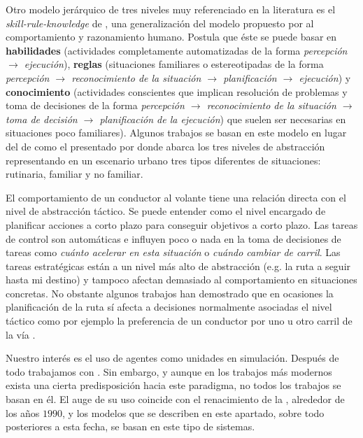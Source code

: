 Otro modelo jerárquico de tres niveles muy referenciado en la literatura es el \textit{skill-rule-knowledge} de \cite{Rasmussen1986}, una generalización del modelo propuesto por \cite{michon1985critical} al comportamiento y razonamiento humano. Postula que éste se puede basar en \textbf{habilidades} (actividades completamente automatizadas de la forma \textit{percepción $\rightarrow$ ejecución}), \textbf{reglas} (situaciones familiares o estereotipadas de la forma \textit{percepción $\rightarrow$ reconocimiento de la situación $\rightarrow$ planificación $\rightarrow$ ejecución}) y \textbf{conocimiento} (actividades conscientes que implican resolución de problemas y toma de decisiones de la forma \textit{percepción $\rightarrow$ reconocimiento de la situación $\rightarrow$ toma de decisión $\rightarrow$ planificación de la ejecución}) que suelen ser necesarias en situaciones poco familiares). Algunos trabajos se basan en este modelo en lugar del de \cite{michon1985critical} como el presentado por \cite{Chaib-draa1994} donde abarca los tres niveles de abstracción representando en un escenario urbano tres tipos diferentes de situaciones: rutinaria, familiar y no familiar.

El comportamiento de un conductor al volante tiene una relación directa con el nivel de abstracción táctico. Se puede entender como el nivel encargado de planificar acciones a corto plazo para conseguir objetivos a corto plazo. Las tareas de control son automáticas e influyen poco o nada en la toma de decisiones de tareas como \textit{cuánto acelerar en esta situación} o \textit{cuándo cambiar de carril}. Las tareas estratégicas están a un nivel más alto de abstracción (e.g. la ruta a seguir hasta mi destino) y tampoco afectan demasiado al comportamiento en situaciones concretas. No obstante algunos trabajos han demostrado que en ocasiones la planificación de la ruta sí afecta a decisiones normalmente asociadas el nivel táctico como por ejemplo la preferencia de un conductor por uno u otro carril de la vía \cite{Wei2000, Toledo2003}.

Nuestro interés es el uso de agentes como unidades en simulación. Después de todo trabajamos con . Sin embargo, y aunque en los trabajos más modernos exista una cierta predisposición hacia este paradigma, no todos los trabajos se basan en él. El auge de su uso coincide con el renacimiento de la , alrededor de los años $1990$, y los modelos que se describen en este apartado, sobre todo posteriores a esta fecha, se basan en este tipo de sistemas.

